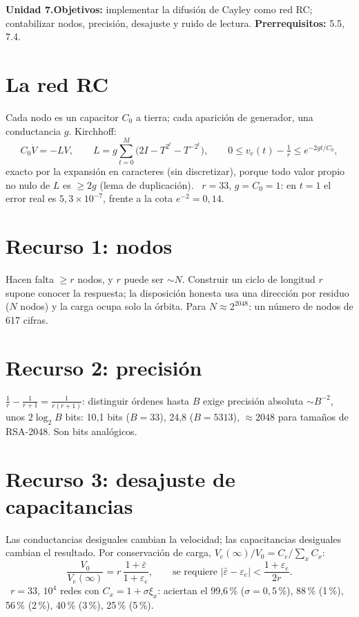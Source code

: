 \documentclass[11pt,a4paper]{article}
\begin{document}

\noindent\textbf{Unidad 7.}\quad\textbf{Objetivos:} implementar la difusión de Cayley como red RC; contabilizar nodos, precisión, desajuste y ruido de lectura.
\textbf{Prerrequisitos:} 5.5, 7.4.

\section{La red RC}
Cada nodo es un capacitor $C_0$ a tierra; cada aparición de generador, una conductancia $g$. Kirchhoff:
\[C_0\dot V=-LV,\qquad L=g\sum_{t=0}^M\big(2I-T^{2^t}-T^{-2^t}\big),\qquad0\le v_e(t)-\tfrac1r\le e^{-2gt/C_0},\]
exacto por la expansión en caracteres (sin discretizar), porque todo valor propio no nulo de $L$ es $\ge2g$ (lema de duplicación).
\evS\ $r=33$, $g=C_0=1$: en $t=1$ el error real es $5{,}3\times10^{-7}$, frente a la cota $e^{-2}=0{,}14$.

\section{Recurso 1: nodos}
Hacen falta $\ge r$ nodos, y $r$ puede ser $\sim N$. Construir un ciclo de longitud $r$ supone conocer la respuesta; la disposición honesta usa una dirección por residuo
($N$ nodos) y la carga ocupa solo la órbita. Para $N\approx2^{2048}$: un número de nodos de 617 cifras.

\section{Recurso 2: precisión}
$\frac1r-\frac1{r+1}=\frac1{r(r+1)}$: distinguir órdenes hasta $B$ exige precisión absoluta $\sim B^{-2}$, unos $2\log_2B$ bits: 10,1 bits ($B=33$), 24,8 ($B=5313$),
$\approx2048$ para tamaños de RSA-2048. Son bits analógicos.

\section{Recurso 3: desajuste de capacitancias}
Las conductancias desiguales cambian la velocidad; las capacitancias desiguales cambian el resultado. Por conservación de carga, $V_e(\infty)/V_0=C_e/\sum_xC_x$:
\[\frac{V_0}{V_e(\infty)}=r\,\frac{1+\bar\varepsilon}{1+\varepsilon_e},\qquad\text{se requiere }|\bar\varepsilon-\varepsilon_e|<\frac{1+\varepsilon_e}{2r}.\]
\evS\ $r=33$, $10^4$ redes con $C_x=1+\sigma\xi_x$: aciertan el 99,6\,\% ($\sigma=0{,}5\,\%$), 88\,\% (1\,\%), 56\,\% (2\,\%), 40\,\% (3\,\%), 25\,\% (5\,\%).
\end{document}

